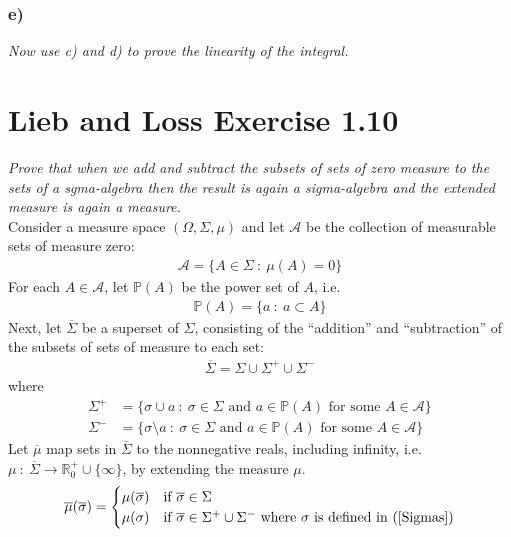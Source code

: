\documentclass[12pt]{article}
\theoremstyle{plain}
\begin{document}
\subsubsection*{ e)}
\emph{Now use c) and d) to prove the linearity of the integral.}

\section*{Lieb and Loss Exercise 1.10}
\emph{Prove that when we add and subtract the subsets of sets of zero measure to the sets of a sgma-algebra then the result is again a sigma-algebra and the extended measure is again a measure.} \\

Consider a measure space $(\Omega, \Sigma, \mu)$ and let $\mathcal{A}$ be the collection of measurable sets of measure zero:
\begin{align*}
    \mathcal{A} = \{A \in \Sigma\ :\ \mu(A) = 0\}
\end{align*}
For each $A \in \mathcal{A}$, let $\mathbb{P}(A)$ be the power set of $A$, i.e.
\begin{align*}
    \mathbb{P}(A) = \{a\ :\ a \subset A\}
\end{align*}
Next, let $\overline{\Sigma}$ be a superset of $\Sigma$, consisting of the ``addition'' and ``subtraction'' of the subsets of sets of measure to each set:
\begin{align*}
    \overline{\Sigma} = \Sigma \cup \Sigma^+ \cup \Sigma^-
\end{align*}
where
\begin{equation}
    \label{Sigmas}
    \begin{aligned}
        \Sigma^+ &= \{\sigma \cup a\ :\ \sigma \in \Sigma \text{ and } a \in \mathbb{P}(A) \text{ for some } A \in \mathcal{A}\} \\
        \Sigma^- &= \{\sigma \setminus a\ :\ \sigma\in \Sigma \text{ and } a \in \mathbb{P}(A) \text{ for some } A \in \mathcal{A}\}
    \end{aligned}
\end{equation}
Let $\overline{\mu}$ map sets in $\overline{\Sigma}$ to the nonnegative reals, including infinity, i.e.~$\mu\ :\ \overline{\Sigma} \rightarrow \mathbb{R}_0^+ \cup \{\infty\}$, by extending the measure $\mu$.
\begin{align*}
    \overline{\mu}(\overline{\sigma}) = \begin{cases}
        \mu(\overline{\sigma}) & \text{if }\overline{\sigma} \in \Sigma \\
        \mu(\sigma) & \text{if } \overline{\sigma} \in \Sigma^+ \cup \Sigma^- \text{ where $\sigma$ is defined in (\ref{Sigmas})}
    \end{cases}
\end{align*}
\end{document}
